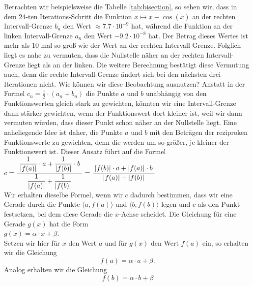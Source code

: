  Betrachten wir beispielsweise die Tabelle \ref{tab:bisection}, so sehen wir, dass
in dem 24-ten Iterations-Schritt die Funktion $x \mapsto x - \cos(x)$ an der rechten
Intervall-Grenze $b_n$ den Wert $\approx 7.7 \cdot 10^{-9}$ hat, w\"ahrend die Funktion an der
linken Intervall-Grenze $a_n$ den Wert $-9.2 \cdot 10^{-8}$ hat.  Der Betrag dieses Wertes ist
mehr als 10 mal so gro{\ss} wie der Wert an der rechten Intervall-Grenze.  Folglich liegt es
nahe zu vermuten, dass die Nullstelle n\"aher an der rechten Intervall-Grenze liegt als an
der linken.  Die weitere Berechnung best\"atigt diese Vermutung auch, denn die rechte
Intervall-Grenze \"andert sich bei den n\"achsten drei Iterationen nicht.  Wie k\"onnen wir
diese Beobachtung ausnutzen?  Anstatt in der Formel $c_n = \frac{1}{2}\cdot(a_n + b_n)$ die
Punkte $a$ und $b$ unabh\"angig von den Funktionswerten gleich stark zu gewichten, k\"onnten
wir eine Intervall-Grenze dann st\"arker gewichten, wenn der Funktionswert dort kleiner ist,
weil wir dann vermuten w\"urden, dass dieser Punkt schon n\"aher an der Nullstelle liegt.
Eine naheliegende Idee ist daher, die Punkte $a$ und $b$ mit den Betr\"agen der reziproken
Funktionswerte zu gewichten, denn die werden um so gr\"o{\ss}er, je kleiner der Funktionswert
ist.  Dieser Ansatz f\"uhrt auf die Formel
\\[0.2cm]
\hspace*{1.3cm} $c = \displaystyle\frac{\;\displaystyle\frac{1}{|f(a)|}\cdot a + \frac{1}{|f(b)|}\cdot b\;}{\;\displaystyle\frac{1}{|f(a)|} +
  \frac{1}{|f(b)|}\;} = \displaystyle\frac{\;\displaystyle|f(b)|\cdot a + |f(a)|\cdot b\;}{\;\displaystyle|f(a)| + |f(b)|\;}$
\\[0.3cm]
Wir erhalten dieselbe Formel, wenn wir $c$ dadurch bestimmen, dass wir eine
Gerade durch die Punkte $\bigl\langle a, f(a)\bigr\rangle$ und $\bigl\langle b, f(b)\bigr\rangle$ legen und
$c$ als 
den Punkt festsetzen, bei dem diese Gerade die $x$-Achse scheidet.  Die Gleichung f\"ur eine
Gerade $g(x)$ hat die Form
\\[0.2cm]
\hspace*{1.3cm} $g(x) = \alpha \cdot x + \beta$.
\\[0.2cm]
Setzen wir hier f\"ur $x$ den Wert $a$ und f\"ur $g(x)$ den Wert $f(a)$ ein, so erhalten wir
die Gleichung
\begin{equation}
  \label{eq:null0}
  f(a) = \alpha \cdot a + \beta.
\end{equation}
Analog erhalten wir die Gleichung
\begin{equation}
  \label{eq:null1}
  f(b) = \alpha \cdot b + \beta
\end{equation}
